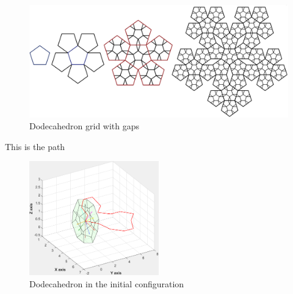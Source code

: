 %
\begin{figure}[h]
\centering
	\includegraphics[width=\textwidth]{image/dodecaGrid.png}
	\caption{Dodecahedron grid with gaps}
	\label{fig:dodecaGrid}
\end{figure}

\noindent This is the path\\

%
\begin{figure}[h]
\centering
	\includegraphics[width=0.5\textwidth]{image/dodecaPath1.pdf}
	\caption{Dodecahedron in the initial configuration}
	\label{fig:dodecaPath1}
\end{figure}








